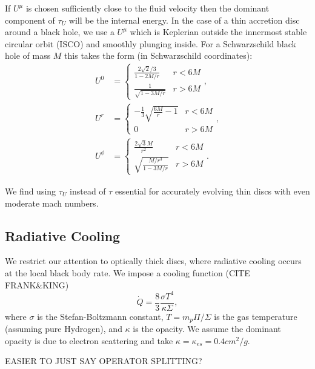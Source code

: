 \documentclass{emulateapj}
\newcommand{\sig}{\sigma}
\newcommand{\Sig}{\Sigma}
\newcommand{\ka}{\kappa}
\begin{document}
If $U^\mu$ is chosen sufficiently close to the fluid velocity then the dominant component of $\tau_U$ will be the internal energy.  In the case of a thin accretion disc around a black hole, we use a $U^\mu$ which is Keplerian outside the innermost stable circular orbit (ISCO) and smoothly plunging inside.  For a Schwarzschild black hole of mass $M$ this takes the form (in Schwarzschild coordinates):
\begin{align}
	U^0 &= \left \{ \begin{matrix} \frac{2\sqrt{2}/3}{1-2M/r} & r < 6M \\
						\frac{1}{\sqrt{1-3M/r}} & r > 6M \end{matrix} \right . , \nonumber \\
	U^r &= \left \{ \begin{matrix} -\frac{1}{3}\sqrt{\frac{6M}{r}-1} & r < 6M \\
						0 & r > 6M \end{matrix} \right . , \nonumber \\
	U^\phi &= \left \{ \begin{matrix}  \frac{2 \sqrt{3} M}{r^2} & r < 6M \\
						\sqrt{\frac{M/r^3}{1-3M/r}} & r > 6M \end{matrix} \right . . \label{eq:Ugeo}
\end{align}

We find using $\tau_U$ instead of $\tau$ essential for accurately evolving thin discs with even moderate mach numbers.

\subsection{Radiative Cooling}
\label{subsec:cooling}

We restrict our attention to optically thick discs, where radiative cooling occurs at the local black body rate. We impose a cooling function (CITE FRANK\&KING)
\begin{equation}
	\dot{Q} = \frac{8}{3} \frac{\sig T^4}{\ka \Sig} , \label{eq:BBcooling}
\end{equation}
where $\sig$ is the Stefan-Boltzmann constant, $T = m_p \Pi / \Sig$ is the gas temperature (assuming pure Hydrogen), and $\ka $ is the opacity.  We assume the dominant opacity is due to electron scattering and take $\ka = \ka_{es} = 0.4 cm^2/g$.

EASIER TO JUST SAY OPERATOR SPLITTING?
\end{document}
